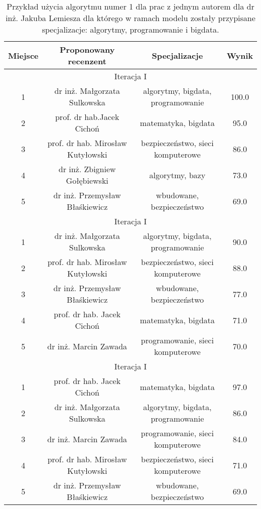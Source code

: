 \begin{table}[h]

        \centering
\begin{tabular}{c|c|c|c}
Miejsce  & Proponowany recenzent &Specjalizacje& Wynik \\  \hline
\multicolumn{4}{c|}{Iteracja I} \\ \hline
1&dr inż. Małgorzata Sulkowska&algorytmy, bigdata, programowanie& 100.0 \\
2&prof. dr hab.Jacek Cichoń & matematyka, bigdata& 95.0 \\
3&prof. dr hab. Mirosław Kutyłowski&bezpieczeństwo, sieci komputerowe& 86.0 \\
4&dr inż. Zbigniew Gołębiewski&algorytmy, bazy& 73.0 \\
5&dr inż. Przemysław Błaśkiewicz&wbudowane, bezpieczeństwo& 69.0 \\ \hline
\multicolumn{4}{c|}{Iteracja I} \\ \hline
1&dr inż. Małgorzata Sulkowska&algorytmy, bigdata, programowanie& 90.0 \\
2&prof. dr hab. Mirosław Kutyłowski&bezpieczeństwo, sieci komputerowe& 88.0 \\
3&dr inż. Przemysław Błaśkiewicz& wbudowane, bezpieczeństwo&77.0 \\
4&prof. dr hab. Jacek Cichoń & matematyka, bigdata&71.0 \\
5&dr inż. Marcin Zawada&programowanie, sieci komputerowe&70.0 \\ \hline
\multicolumn{4}{c|}{Iteracja I} \\ \hline
1&prof. dr hab. Jacek Cichoń& matematyka, bigdata&97.0 \\
2&dr inż. Małgorzata Sulkowska&algorytmy, bigdata, programowanie&86.0 \\
3&dr inż. Marcin Zawada&programowanie, sieci komputerowe&84.0 \\
4&prof. dr hab. Mirosław Kutyłowski&bezpieczeństwo, sieci komputerowe& 71.0 \\
5&dr inż. Przemysław Błaśkiewicz& wbudowane, bezpieczeństwo&69.0 \\ \hline

\end{tabular}
\caption{Przykład użycia algorytmu numer 1 dla prac z jednym autorem dla dr inż. Jakuba Lemiesza dla którego w ramach modelu zostały przypisane specjalizacje: algorytmy, programowanie i bigdata.}

\label{table:1}
\end{table}
